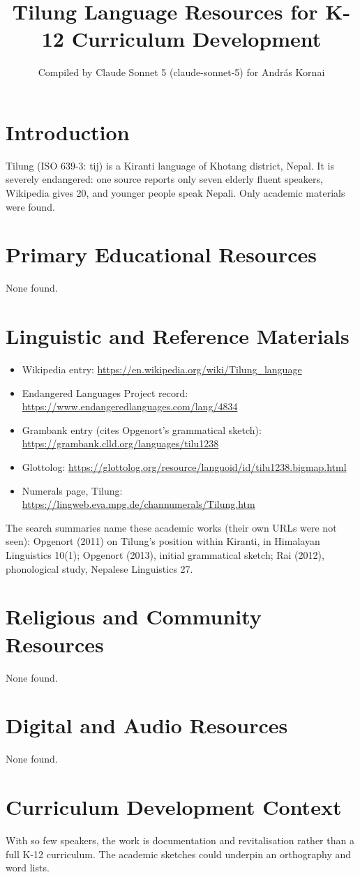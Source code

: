 \documentclass[12pt]{article}
\title{Tilung Language Resources for K-12 Curriculum Development}
\author{Compiled by Claude Sonnet 5 (claude-sonnet-5) for Andr\'as Kornai}
\date{}
\begin{document}
\maketitle

\section{Introduction}
Tilung (ISO 639-3: tij) is a Kiranti language of Khotang district, Nepal. It is severely endangered: one source reports only seven elderly fluent speakers, Wikipedia gives 20, and younger people speak Nepali. Only academic materials were found.

\section{Primary Educational Resources}
None found.

\section{Linguistic and Reference Materials}
\begin{itemize}
\item Wikipedia entry: \url{https://en.wikipedia.org/wiki/Tilung_language}
\item Endangered Languages Project record: \url{https://www.endangeredlanguages.com/lang/4834}
\item Grambank entry (cites Opgenort's grammatical sketch): \url{https://grambank.clld.org/languages/tilu1238}
\item Glottolog: \url{https://glottolog.org/resource/languoid/id/tilu1238.bigmap.html}
\item Numerals page, Tilung: \url{https://lingweb.eva.mpg.de/channumerals/Tilung.htm}
\end{itemize}
The search summaries name these academic works (their own URLs were not seen): Opgenort (2011) on Tilung's position within Kiranti, in Himalayan Linguistics 10(1); Opgenort (2013), initial grammatical sketch; Rai (2012), phonological study, Nepalese Linguistics 27.

\section{Religious and Community Resources}
None found.

\section{Digital and Audio Resources}
None found.

\section{Curriculum Development Context}
With so few speakers, the work is documentation and revitalisation rather than a full K-12 curriculum. The academic sketches could underpin an orthography and word lists.
\end{document}
